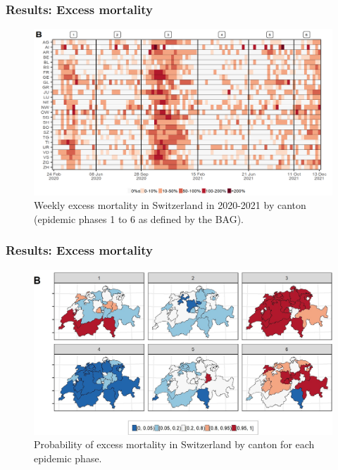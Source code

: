 \documentclass[10pt]{beamer}
\begin{document}
\begin{frame}
\frametitle{Results: Excess mortality}
\begin{figure}[t]
	\includegraphics[width=\linewidth ]{excess_fig}
	\caption{Weekly excess mortality in Switzerland in 2020-2021 by canton (epidemic phases 1 to 6 as defined by the BAG).}
\end{figure}
\end{frame}

\begin{frame}
\frametitle{Results: Excess mortality}
\begin{figure}[t]
	\includegraphics[width=\linewidth ]{spatial_excess}
	\caption{Probability of excess mortality in Switzerland by canton for each epidemic phase.}
\end{figure}
\end{frame}
\end{document}
